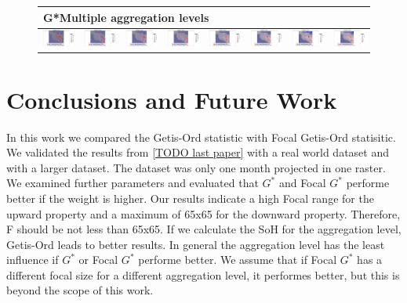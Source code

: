 \documentclass{itatnew}
\begin{document}
\begin{figure}[htp]
  \begin{tabular}{cccccccc}
    \hline
    \multicolumn{8}{l}{G*Multiple aggregation levels} \\
    \hline
    \includegraphics[width=4.6em]{images/gen-demo-zoom-gstar-1}&
    \includegraphics[width=4.6em]{images/gen-demo-zoom-gstar-2}&
    \includegraphics[width=4.6em]{images/gen-demo-zoom-gstar-3}&
    \includegraphics[width=4.6em]{images/gen-demo-zoom-gstar-4}&
    \includegraphics[width=4.6em]{images/gen-demo-zoom-gstar-5}&
    \includegraphics[width=4.6em]{images/gen-demo-zoom-gstar-6}&
    \includegraphics[width=4.6em]{images/gen-demo-zoom-gstar-7}&
    \includegraphics[width=4.6em]{images/gen-demo-zoom-gstar-8}
  \end{tabular}
  
\end{figure}





\section{Conclusions and Future Work} \label{sec:Conclusion}
In this work we compared the Getis-Ord statistic with Focal Getis-Ord statisitic. 
We validated the results from \ref{TODO last paper} with a real world 
dataset and with a larger dataset. The dataset was only one month projected in one raster. 
We examined further parameters and evaluated that $G^*$ and Focal $G^*$ performe better if the weight
is higher.
Our results indicate a high Focal range for the upward property and a maximum of 65x65 for the downward property.
Therefore, F should be not less than 65x65. 
If we calculate the SoH for the aggregation level, Getis-Ord leads to better results. In general the aggregation level 
has the least influence if $G^*$ or Focal $G^*$ performe better.
We assume that if Focal $G^*$ has a different focal size for a different aggregation level, 
it performes better, but this is beyond the scope of this work.
\end{document}
